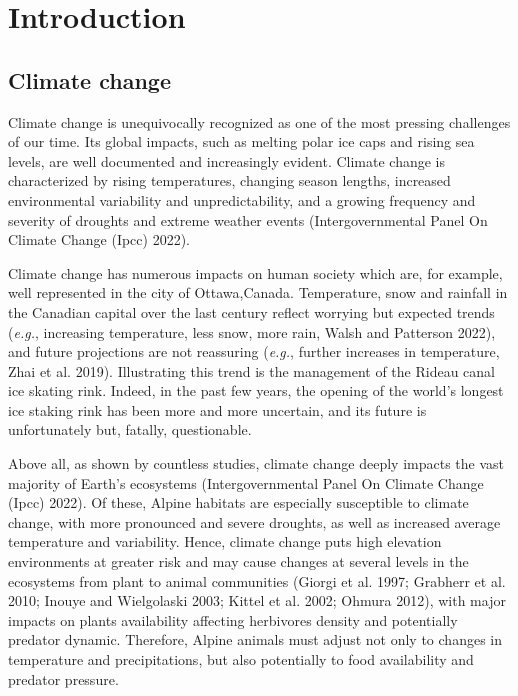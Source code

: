 \documentclass[
  12pt,
  letterpaper,
]{scrartcl}
\begin{document}
\pagebreak
\tableofcontents
\vfill
\pagebreak


\newpage{}

\section{Introduction}\label{sec-intro}

\subsection{Climate change}\label{climate-change}

Climate change is unequivocally recognized as one of the most pressing
challenges of our time. Its global impacts, such as melting polar ice
caps and rising sea levels, are well documented and increasingly
evident. Climate change is characterized by rising temperatures,
changing season lengths, increased environmental variability and
unpredictability, and a growing frequency and severity of droughts and
extreme weather events (Intergovernmental Panel On Climate Change (Ipcc)
2022).

Climate change has numerous impacts on human society which are, for
example, well represented in the city of Ottawa,Canada. Temperature,
snow and rainfall in the Canadian capital over the last century reflect
worrying but expected trends (\emph{e.g.}, increasing temperature, less
snow, more rain, Walsh and Patterson 2022), and future projections are
not reassuring (\emph{e.g.}, further increases in temperature, Zhai et
al. 2019). Illustrating this trend is the management of the Rideau canal
ice skating rink. Indeed, in the past few years, the opening of the
world's longest ice staking rink has been more and more uncertain, and
its future is unfortunately but, fatally, questionable.

Above all, as shown by countless studies, climate change deeply impacts
the vast majority of Earth's ecosystems (Intergovernmental Panel On
Climate Change (Ipcc) 2022). Of these, Alpine habitats are especially
susceptible to climate change, with more pronounced and severe droughts,
as well as increased average temperature and variability. Hence, climate
change puts high elevation environments at greater risk and may cause
changes at several levels in the ecosystems from plant to animal
communities (Giorgi et al. 1997; Grabherr et al. 2010; Inouye and
Wielgolaski 2003; Kittel et al. 2002; Ohmura 2012), with major impacts
on plants availability affecting herbivores density and potentially
predator dynamic. Therefore, Alpine animals must adjust not only to
changes in temperature and precipitations, but also potentially to food
availability and predator pressure.
\end{document}

